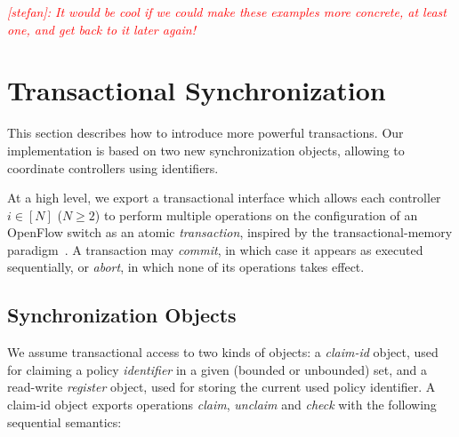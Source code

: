 \documentclass[conference]{sigcomm-alternate}
\newcommand{\stefan}[1]{\textit{\textcolor{red}{[stefan]: #1}}} %
\begin{document}
\stefan{It would be cool if we could make these examples more concrete,
at least one, and get back to it later again!}

\section{Transactional Synchronization}\label{sec:main}

This section describes how to introduce more powerful transactions.
Our implementation is based on two new synchronization objects,
allowing to coordinate controllers using identifiers.

At a high level, we export a
transactional interface which allows each controller $i\in[N]$ ($N\geq
2$) to perform multiple
operations on the configuration of an OpenFlow switch as an atomic
\emph{transaction}, inspired by the transactional-memory paradigm~\cite{stm-st95,tm-book}. A transaction may \emph{commit}, in
which case it appears as executed sequentially, or \emph{abort}, in
which none of its operations takes effect.  

\subsection{Synchronization Objects}\label{sec:t-if}

We assume transactional access to  two kinds of objects: a
\emph{claim-id} object, used for claiming a policy \emph{identifier} in a
given (bounded or unbounded) set, and a read-write \emph{register}
object, used for storing the current used policy identifier.
%
A claim-id object exports operations \emph{claim},
\emph{unclaim} and \emph{check} with the following sequential
semantics:
\end{document}
